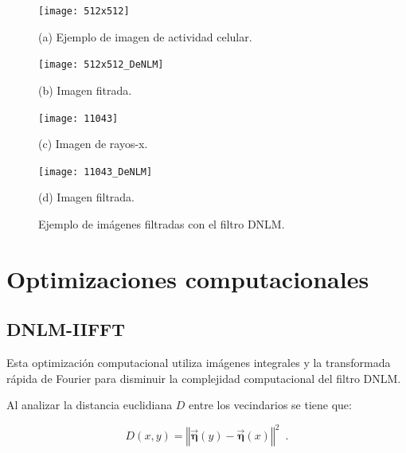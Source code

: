 \begin{figure}[H]
\centering
\begin{minipage}[b]{0.3\textwidth}
  \centering
  \centerline{\texttt{[image: 512x512]}}
  \centerline{(a) Ejemplo de imagen de actividad celular.}\medskip
\end{minipage}
\hfill
\begin{minipage}[b]{0.3\textwidth}
  \centering
  \centerline{\texttt{[image: 512x512\_DeNLM]}}
  \centerline{(b) Imagen fitrada.}
\end{minipage}
\vfill
\begin{minipage}[b]{0.3\textwidth}
  \centering
  \centerline{\texttt{[image: 11043]}}
  \centerline{(c) Imagen de rayos-x.}\medskip
\end{minipage}
\hfill
\begin{minipage}[b]{0.3\textwidth}
  \centering
  \centerline{\texttt{[image: 11043\_DeNLM]}}
  \centerline{(d) Imagen filtrada.}\medskip
\end{minipage}
%
\caption[Ejemplo de im\'agenes filtradas con el filtro DNLM]{Ejemplo de im\'agenes filtradas con el filtro DNLM. \label{fig:exampleDNLM}}

%
\end{figure}



\section{Optimizaciones computacionales}
\label{ch:marco_opt}

\subsection{DNLM-IIFFT}
\label{ch:marco_dnlmifft}

Esta optimización computacional utiliza im\'agenes integrales y la transformada r\'apida de Fourier para disminuir la complejidad computacional del filtro DNLM. 



Al analizar la distancia euclidiana $D$ entre los vecindarios se tiene que:

\begin{equation}
D\left(x,y\right)=\left\Vert \vec{\boldsymbol{\eta}}\left(y\right)-\vec{\boldsymbol{\eta}}\left(x\right)\right\Vert^2 \enspace . 
\end{equation}

